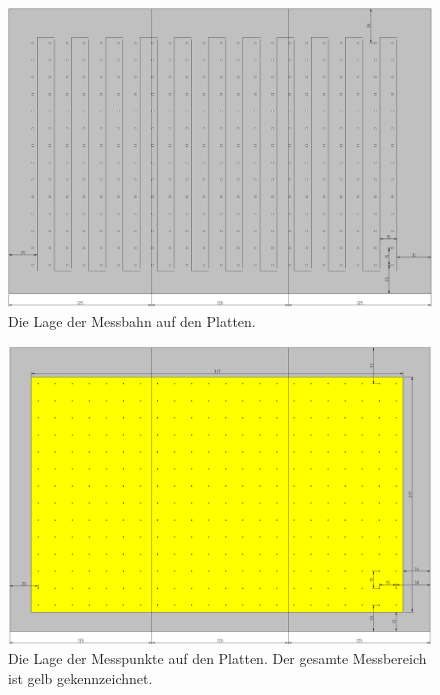 \documentclass[a4paper,bibtotoc,oneside]{scrbook}
\begin{document}
\begin{figure}[htbp]
\centering
\includegraphics[width=125mm]{img/dreiplatten10.png}
\caption{Die Lage der Messbahn auf den Platten.}\label{platten}
\end{figure}

\begin{figure}[htbp]
\centering
\includegraphics[width=125mm]{img/punkte.png}
\caption{Die Lage der Messpunkte auf den Platten. Der gesamte Messbereich ist gelb gekennzeichnet.}\label{punkte}
\end{figure}
\end{document}

